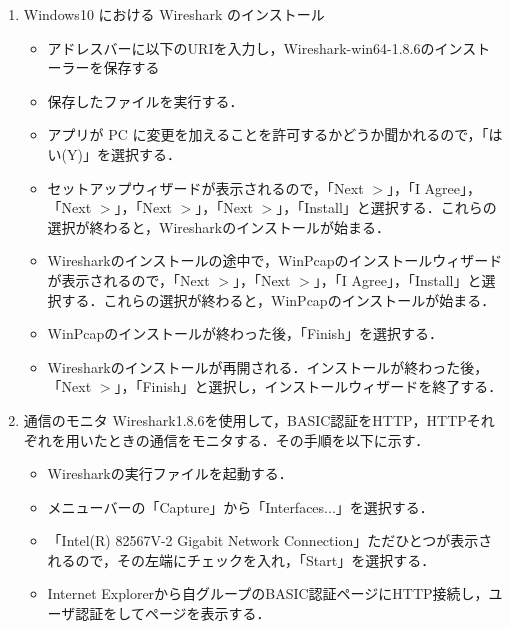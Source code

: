 \documentclass[a4j,titlepage]{jarticle}
\begin{document}
\begin{enumerate}
\item Windows10 における Wireshark のインストール

\begin{itemize}
\item アドレスバーに以下のURIを入力し，Wireshark-win64-1.8.6のインストーラーを保存する

\item 保存したファイルを実行する．

\item アプリが PC に変更を加えることを許可するかどうか聞かれるので，「はい(Y)」を選択する．

\item セットアップウィザードが表示されるので，「Next $>$」，「I Agree」，「Next $>$」，「Next $>$」，「Next $>$」，「Install」と選択する．これらの選択が終わると，Wiresharkのインストールが始まる．

\item Wiresharkのインストールの途中で，WinPcapのインストールウィザードが表示されるので，「Next $>$」，「Next $>$」，「I Agree」，「Install」と選択する．これらの選択が終わると，WinPcapのインストールが始まる．

\item WinPcapのインストールが終わった後，「Finish」を選択する．

\item Wiresharkのインストールが再開される．インストールが終わった後，「Next $>$」，「Finish」と選択し，インストールウィザードを終了する．

\end{itemize}


\item 通信のモニタ
Wireshark1.8.6を使用して，BASIC認証をHTTP，HTTPそれぞれを用いたときの通信をモニタする．その手順を以下に示す．

\begin{itemize}

\item Wiresharkの実行ファイルを起動する．

\item メニューバーの「Capture」から「Interfaces...」を選択する．

\item 「Intel(R) 82567V-2 Gigabit Network Connection」ただひとつが表示されるので，その左端にチェックを入れ，「Start」を選択する．

\item Internet Explorerから自グループのBASIC認証ページにHTTP接続し，ユーザ認証をしてページを表示する．


\end{itemize}
\end{enumerate}
\end{document}
